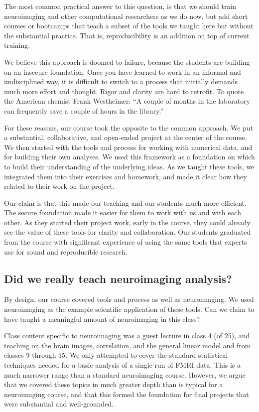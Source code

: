 The most common practical answer to this question, is that we should train
neuroimaging and other computational researchers as we do now, but add short
courses or bootcamps that teach a subset of the tools we taught here but
without the substantial practice.  That is, reproducibility is an addition on
top of current training.

We believe this approach is doomed to failure, because the students are
building on an insecure foundation.  Once you have learned to work in an
informal and undisciplined way, it is difficult to switch to a process that
initially demands much more effort and thought.  Rigor and clarity are hard to
retrofit.
To quote the American chemist Frank Westheimer:
``A couple of months in the laboratory can frequently save a couple of hours
in the library.''

For these reasons, our course took the opposite to the common approach.
We put a substantial, collaborative, and open-ended project at the center of
the course.
We then started with the tools and process for working with numerical data, and
for building their own analyses.
We used this framework as a foundation on which to build their understanding of
the underlying ideas.
As we taught these tools, we integrated them into their exercises and homework,
and made it clear how they related to their work on the project.

Our claim is that this made our teaching and our students much more efficient.
The secure foundation made it easier for them to work with us and with each
other. As they started their project work, early in the course, they could
already see the value of these tools for clarity and collaboration. Our
students graduated from the course with significant experience of using the
same tools that experts use for sound and reproducible research.

\subsection{Did we really teach neuroimaging analysis?}

By design, our course covered tools and process as well as neuroimaging.  We
used neuroimaging as the example scientific application of these tools.  Can
we claim to have taught a meaningful amount of neuroimaging in this class?

Class content specific to neuroimaging was a guest lecture in class 4 (of 25),
and teaching on the brain images, correlation, and the general linear model and
from classes 9 through 15.  We only attempted to cover the standard
statistical techniques needed for a basic analysis of a single run of FMRI
data.  This is a much narrower range than a standard neuroimaging course.
However, we argue that we covered these topics in much greater depth than is
typical for a neuroimaging course, and that this formed the foundation for
final projects that were substantial and well-grounded.

